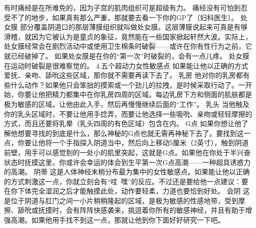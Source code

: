 \documentclass[12pt,UTF8]{ctexbook}
\begin{document}
有时痛经是在所难免的，因为子宫的肌肉组织可是超级有力。
痛经没有可怕到忍受不了的地步，如果真有那么严重，那就要去看一下你的GP了（妇科医生）。
处女膜
部分覆盖阴道口的那层薄膜组织就叫做处女膜。这层薄膜说起来可真是有够滑稽，就因为它被认为是童贞的象征，竟然能在一些国家掀起轩然大波。实际上，处女膜经常会在剧烈活动中或使用卫生棉条时破裂——或许在你有性行为之前，它就已经破掉了。
如果处女膜是在你的“第一次”时破裂的，会有一点儿疼。
处女膜在运动时破裂是很难察觉的。
4.五个超动力女性敏感点
如果能让他以正确的方式爱抚、亲吻、舔吮这些区域，那你就不需要再读下去了。
乳房
他对你的乳房都有些什么动作？如果他只会笨拙的摸索或一个劲儿的拉拽，是时候采取行动了。一开始，你要让他把精力都集中在你乳房四周的区域。每边乳房下方和侧面的肌肤都是极为敏感的区域。让他由此入手，然后再慢慢继续后面的“工作”。
乳头
当他触及你的乳头区域时，不要让他用手捻弄，而要让他选择一些吸吮、亲吻或轻轻摩擦的方式，而且还要将乳晕（乳头四周的有色区域）包含在内。
G点
如果你想让他了解他想要寻找的到底是什么，那么神秘的G点也就无需再神秘下去了。要找到这一点，你要让他将一个手指探入阴道当中，然后向上移动5厘米（2英寸），触到阴道前壁，用手可以感觉到的一处小的肌里突起，这就是G点。如果他在你处于半兴奋状态时抚摸这里，你或许会幸运的体会到生平第一次G点高潮——一种超具诱惑力的高潮。
阴蒂
这是人体神经末梢分布最为集中的女性敏感点。如果能让他以正确的方式刺激这一点，你就立刻会有“哇~嘿”的反应。不过还是要给他一点建议：要在你下体完全湿润之后才能触摸此处，动作要轻柔，力道也要恰到好处。
会阴
这是位于阴道与肛门之间一小片稍稍隆起的区域，是极为敏感的性感地带，受到摩擦、舔吮或抚摸时，会有阵阵快感袭来，挑逗着你所有的敏感神经，并且有助于增强高潮。如果他用手找不到这一点，那就让他到你下面好好研究一下吧。
\end{document}
